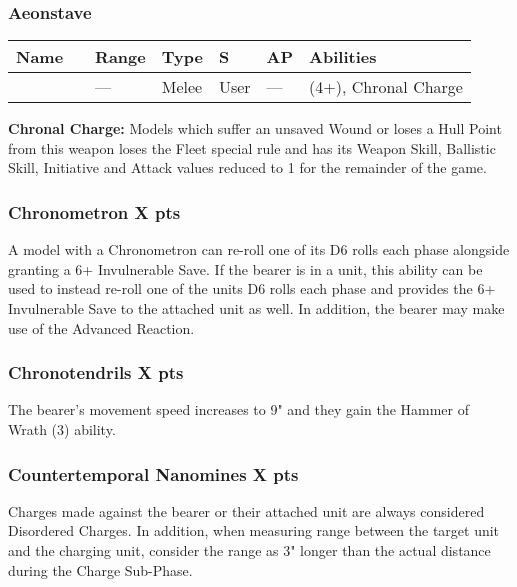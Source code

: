 \subsubsection{Aeonstave}
\label{Aeonstave}
\noindent
\begin{tabular}{||m{130pt} m{10pt} m{31pt} m{55pt} m{12pt} m{12pt} m{210pt}||}
	\hline
	Name & & Range & Type & S & AP & Abilities \\
	\hline
	\quickref{Aeonstave} & & — & Melee & User & — & \quickref{Entropic Strike} (4+), Chronal Charge \\
	\hline
\end{tabular}
\textbf{Chronal Charge:} Models which suffer an unsaved Wound or loses a Hull Point from this weapon loses the Fleet special rule and has its Weapon Skill, Ballistic Skill, Initiative and Attack values reduced to 1 for the remainder of the game.

\subsubsection[Chronometron ]{Chronometron  \hrulefill X pts}

A model with a Chronometron can re-roll one of its D6 rolls each phase alongside granting a 6+ Invulnerable Save. If the bearer is in a unit, this ability can be used to instead re-roll one of the units D6 rolls each phase and provides the 6+ Invulnerable Save to the attached unit as well. In addition, the bearer may make use of the  Advanced Reaction.

\subsubsection[Chronotendrils ]{Chronotendrils  \hrulefill X pts}

The bearer's movement speed increases to 9" and they gain the Hammer of Wrath (3) ability.

\subsubsection[Countertemporal Nanomines ]{Countertemporal Nanomines  \hrulefill X pts}

Charges made against the bearer or their attached unit are always considered Disordered Charges. In addition, when measuring range between the target unit and the charging unit, consider the range as 3" longer than the actual distance during the Charge Sub-Phase.

